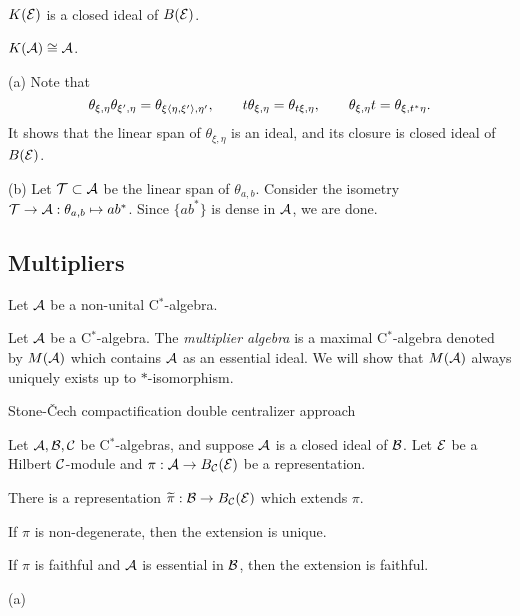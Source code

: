 \documentclass{../../small}
\begin{document}
\begin{prop}\,
\begin{parts}
\item $K(\mathcal{E})$ is a closed ideal of $B(\mathcal{E})$.
\item $K(\mathcal{A})\cong\mathcal{A}$.
\end{parts}
\end{prop}
\begin{pf}
(a)
Note that
\[\theta_{\xi,\eta}\theta_{\xi',\eta}=\theta_{\xi\langle\eta,\xi'\rangle,\eta'},\qquad t\theta_{\xi,\eta}=\theta_{t\xi,\eta},\qquad\theta_{\xi,\eta}t=\theta_{\xi,t^*\eta}.\]
It shows that the linear span of $\theta_{\xi,\eta}$ is an ideal, and its closure is closed ideal of $B(\mathcal{E})$.

(b)
Let $\mathcal{T}\subset\mathcal{A}$ be the linear span of $\theta_{a,b}$. 
Consider the isometry $\mathcal{T}\to\mathcal{A}:\theta_{a,b}\mapsto ab^*$.
Since $\{ab^*\}$ is dense in $\mathcal{A}$, we are done.

\end{pf}









\subsection{Multipliers}

Let $\mathcal{A}$ be a non-unital C$^*$-algebra.

\begin{defn}
Let $\mathcal{A}$ be a C$^*$-algebra.
The \emph{multiplier algebra} is a maximal C$^*$-algebra denoted by $M(\mathcal{A})$ which contains $\mathcal{A}$ as an essential ideal.
We will show that $M(\mathcal{A})$ always uniquely exists up to $*$-isomorphism.
\end{defn}

Stone-\v Cech compactification
double centralizer approach


\begin{prop}
Let $\mathcal{A},\mathcal{B},\mathcal{C}$ be C$^*$-algebras, and suppose $\mathcal{A}$ is a closed ideal of $\mathcal{B}$.
Let $\mathcal{E}$ be a Hilbert $\mathcal{C}$-module and $\pi:\mathcal{A}\to B_{\mathcal{C}}(\mathcal{E})$ be a representation.
\begin{parts}
\item
There is a representation $\widetilde\pi:\mathcal{B}\to B_{\mathcal{C}}(\mathcal{E})$ which extends $\pi$.
\item If $\pi$ is non-degenerate, then the extension is unique.
\item If $\pi$ is faithful and $\mathcal{A}$ is essential in $\mathcal{B}$, then the extension is faithful.
\end{parts}
\end{prop}
\begin{pf}
(a)

\end{pf}
\end{document}
